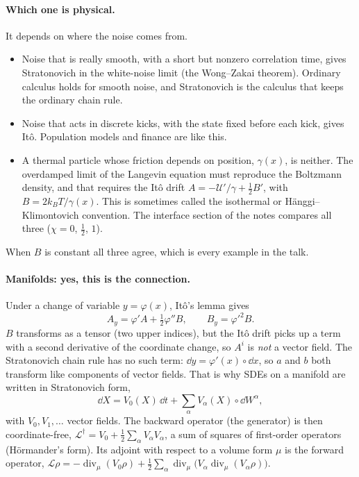 \documentclass[11pt]{article}
\newcommand{\Lop}{\mathcal{L}}
\newcommand{\cU}{\mathcal{U}}
\begin{document}
\paragraph{Which one is physical.} It depends on where the noise comes from.
\begin{itemize}
  \item Noise that is really smooth, with a short but nonzero correlation time, gives Stratonovich in the white-noise
        limit (the Wong--Zakai theorem). Ordinary calculus holds for smooth noise, and Stratonovich is the
        calculus that keeps the ordinary chain rule.
  \item Noise that acts in discrete kicks, with the state fixed before each kick, gives It\^o. Population models
        and finance are like this.
  \item A thermal particle whose friction depends on position, $\gamma(x)$, is neither. The overdamped limit of the
        Langevin equation must reproduce the Boltzmann density, and that requires the It\^o drift
        $A=-\cU'/\gamma+\frac12B'$, with $B=2k_BT/\gamma(x)$. This is sometimes called the isothermal or
        H\"anggi--Klimontovich convention. The interface section of the notes compares all three ($\chi=0$, $\frac12$, $1$).
\end{itemize}
When $B$ is constant all three agree, which is every example in the talk.

\paragraph{Manifolds: yes, this is the connection.} Under a change of variable $y=\varphi(x)$, It\^o's lemma gives
\[
  A_y=\varphi'A+\tfrac12\varphi''B,\qquad B_y=\varphi'^2B .
\]
$B$ transforms as a tensor (two upper indices), but the It\^o drift picks up a term with a second derivative of the
coordinate change, so $A^i$ is \emph{not} a vector field. The Stratonovich chain rule has no such term: $\dd
y=\varphi'(x)\circ\dd x$, so $a$ and $b$ both transform like components of vector fields. That is why SDEs on a
manifold are written in Stratonovich form,
\[
  \dd X=V_0(X)\,\dd t+\sum_\alpha V_\alpha(X)\circ\dd W^\alpha,
\]
with $V_0,V_1,\dots$ vector fields. The backward operator (the generator) is then coordinate-free,
$\Lop^\dagger=V_0+\frac12\sum_\alpha V_\alpha V_\alpha$, a sum of squares of first-order operators (H\"ormander's form).
Its adjoint with respect to a volume form $\mu$ is the forward operator,
$\Lop\rho=-\operatorname{div}_\mu(V_0\rho)+\frac12\sum_\alpha\operatorname{div}_\mu\bigl(V_\alpha\operatorname{div}_\mu(V_\alpha\rho)\bigr)$.
\end{document}
